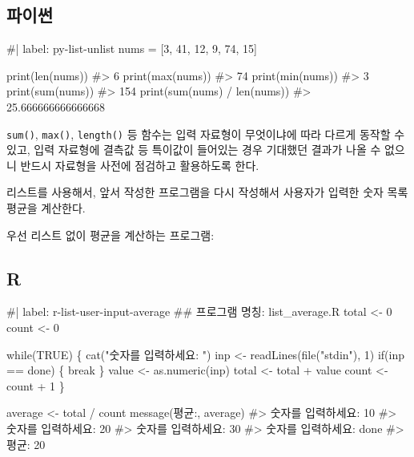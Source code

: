 \documentclass[
  letterpaper,
]{book}
\newenvironment{Shaded}{\begin{snugshade}}{\end{snugshade}}
\newcommand{\NormalTok}[1]{\textcolor[rgb]{0.00,0.23,0.31}{#1}}
\begin{document}
\subsection{파이썬}

\begin{Shaded}
\begin{Highlighting}[]
\NormalTok{\#| label: py{-}list{-}unlist}
\NormalTok{nums = [3, 41, 12, 9, 74, 15]}

\NormalTok{print(len(nums))}
\NormalTok{\#\textgreater{} 6}
\NormalTok{print(max(nums))}
\NormalTok{\#\textgreater{} 74}
\NormalTok{print(min(nums))}
\NormalTok{\#\textgreater{} 3  }
\NormalTok{print(sum(nums))}
\NormalTok{\#\textgreater{} 154  }
\NormalTok{print(sum(nums) / len(nums))}
\NormalTok{\#\textgreater{} 25.666666666666668}
\end{Highlighting}
\end{Shaded}

\texttt{sum()}, \texttt{max()}, \texttt{length()} 등 함수는 입력
자료형이 무엇이냐에 따라 다르게 동작할 수 있고, 입력 자료형에 결측값 등
특이값이 들어있는 경우 기대했던 결과가 나올 수 없으니 반드시 자료형을
사전에 점검하고 활용하도록 한다.

리스트를 사용해서, 앞서 작성한 프로그램을 다시 작성해서 사용자가 입력한
숫자 목록 평균을 계산한다.

우선 리스트 없이 평균을 계산하는 프로그램:

\subsection{R}

\begin{Shaded}
\begin{Highlighting}[]
\NormalTok{\#| label: r{-}list{-}user{-}input{-}average}
\NormalTok{\#\# 프로그램 명칭: \textasciigrave{}list\_average.R\textasciigrave{}}
\NormalTok{total \textless{}{-} 0}
\NormalTok{count \textless{}{-} 0}

\NormalTok{while(TRUE) \{}
\NormalTok{  cat("숫자를 입력하세요: ")}
\NormalTok{  inp \textless{}{-} readLines(file("stdin"), 1)}
\NormalTok{  if(inp == \textquotesingle{}done\textquotesingle{}) \{}
\NormalTok{    break}
\NormalTok{  \}}
\NormalTok{  value \textless{}{-} as.numeric(inp)}
\NormalTok{  total \textless{}{-} total + value}
\NormalTok{  count \textless{}{-} count + 1}
\NormalTok{\}}

\NormalTok{average \textless{}{-} total / count}
\NormalTok{message(\textquotesingle{}평균:\textquotesingle{}, average)}
\NormalTok{\#\textgreater{} 숫자를 입력하세요: 10}
\NormalTok{\#\textgreater{} 숫자를 입력하세요: 20}
\NormalTok{\#\textgreater{} 숫자를 입력하세요: 30}
\NormalTok{\#\textgreater{} 숫자를 입력하세요: done}
\NormalTok{\#\textgreater{} 평균: 20}
\end{Highlighting}
\end{Shaded}
\end{document}
